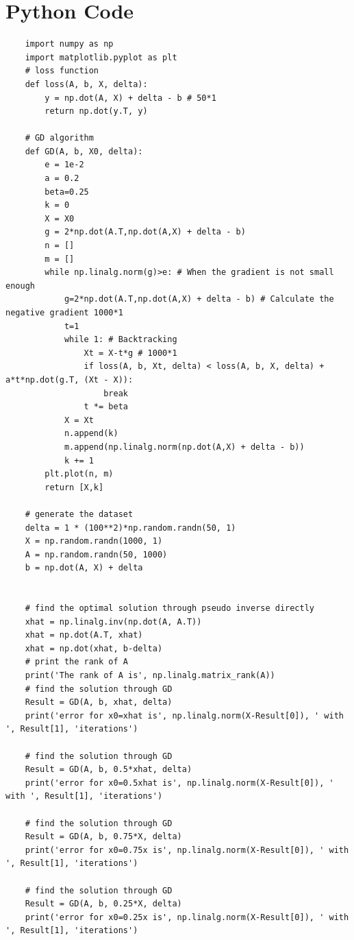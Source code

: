 \documentclass[a4paper]{article}
\begin{document}
\section*{Python Code}
\begin{verbatim}
    import numpy as np
    import matplotlib.pyplot as plt
    # loss function
    def loss(A, b, X, delta):
        y = np.dot(A, X) + delta - b # 50*1
        return np.dot(y.T, y)
    
    # GD algorithm
    def GD(A, b, X0, delta):
        e = 1e-2
        a = 0.2
        beta=0.25
        k = 0
        X = X0
        g = 2*np.dot(A.T,np.dot(A,X) + delta - b)
        n = []
        m = []
        while np.linalg.norm(g)>e: # When the gradient is not small enough
            g=2*np.dot(A.T,np.dot(A,X) + delta - b) # Calculate the negative gradient 1000*1
            t=1   
            while 1: # Backtracking
                Xt = X-t*g # 1000*1
                if loss(A, b, Xt, delta) < loss(A, b, X, delta) + a*t*np.dot(g.T, (Xt - X)):
                    break
                t *= beta
            X = Xt
            n.append(k)
            m.append(np.linalg.norm(np.dot(A,X) + delta - b))
            k += 1
        plt.plot(n, m)
        return [X,k]
    
    # generate the dataset
    delta = 1 * (100**2)*np.random.randn(50, 1)
    X = np.random.randn(1000, 1)
    A = np.random.randn(50, 1000)
    b = np.dot(A, X) + delta
    
    
    # find the optimal solution through pseudo inverse directly
    xhat = np.linalg.inv(np.dot(A, A.T))
    xhat = np.dot(A.T, xhat)
    xhat = np.dot(xhat, b-delta)
    # print the rank of A
    print('The rank of A is', np.linalg.matrix_rank(A))
    # find the solution through GD
    Result = GD(A, b, xhat, delta)
    print('error for x0=xhat is', np.linalg.norm(X-Result[0]), ' with ', Result[1], 'iterations')
    
    # find the solution through GD
    Result = GD(A, b, 0.5*xhat, delta)
    print('error for x0=0.5xhat is', np.linalg.norm(X-Result[0]), ' with ', Result[1], 'iterations')
    
    # find the solution through GD
    Result = GD(A, b, 0.75*X, delta)
    print('error for x0=0.75x is', np.linalg.norm(X-Result[0]), ' with ', Result[1], 'iterations')
    
    # find the solution through GD
    Result = GD(A, b, 0.25*X, delta)
    print('error for x0=0.25x is', np.linalg.norm(X-Result[0]), ' with ', Result[1], 'iterations')
    

\end{verbatim}
\end{document}
